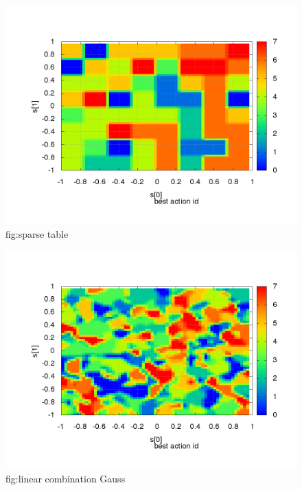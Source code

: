 \begin{figure}[!htb]
\centering
\includegraphics[scale=.4]{../../results_q_learning/map_1/function_type_1/iterations_10/action_best_value_log_surface.png}
\caption{fig:sparse table}
\end{figure}

\begin{figure}[!htb]
\centering
\includegraphics[scale=.4]{../../results_q_learning/map_1/function_type_2/iterations_10/action_best_value_log_surface.png}
\caption{fig:linear combination Gauss}
\end{figure}




